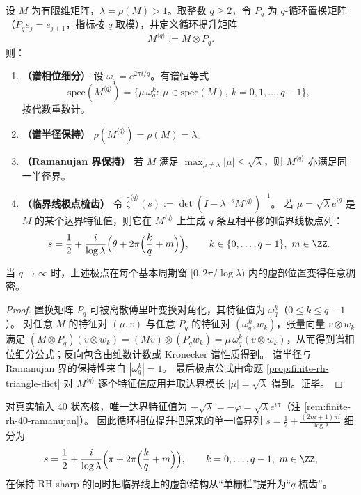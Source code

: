 \begin{proposition}\label{prop:finite-rh-phase-lift}
设 $M$ 为有限维矩阵，$\lambda=\rho(M)>1$。取整数 $q\ge 2$，令 $P_q$ 为 $q$-循环置换矩阵（$P_q e_j=e_{j+1}$，指标按 $q$ 取模），并定义循环提升矩阵
\[
M^{\langle q\rangle}:=M\otimes P_q.
\]
则：
\begin{enumerate}
  \item \textbf{（谱相位细分）} 设 $\omega_q=e^{2\pi i/q}$。有谱恒等式
  \[
  \mathrm{spec}(M^{\langle q\rangle})
  =\{\mu\,\omega_q^k:\ \mu\in \mathrm{spec}(M),\ k=0,1,\dots,q-1\},
  \]
  按代数重数计。
  \item \textbf{（谱半径保持）} $\rho(M^{\langle q\rangle})=\rho(M)=\lambda$。
  \item \textbf{（Ramanujan 界保持）} 若 $M$ 满足 $\max_{\mu\neq \lambda}|\mu|\le \sqrt{\lambda}$，则 $M^{\langle q\rangle}$ 亦满足同一半径界。
  \item \textbf{（临界线极点梳齿）} 令
  \(
  \widehat{\zeta}^{\langle q\rangle}(s):=\det(I-\lambda^{-s}M^{\langle q\rangle})^{-1}
  \)。
  若 $\mu=\sqrt{\lambda}e^{i\theta}$ 是 $M$ 的某个达界特征值，则它在 $M^{\langle q\rangle}$ 上生成 $q$ 条互相平移的临界线极点列：
  \[
  s=\frac12+\frac{i}{\log\lambda}\Bigl(\theta+2\pi\Bigl(\frac{k}{q}+m\Bigr)\Bigr),
  \qquad k\in\{0,\dots,q-1\},\ m\in\ZZ.
  \]
\end{enumerate}
当 $q\to\infty$ 时，上述极点在每个基本周期窗 $[0,2\pi/\log\lambda)$ 内的虚部位置变得任意稠密。
\end{proposition}

\begin{proof}
置换矩阵 $P_q$ 可被离散傅里叶变换对角化，其特征值为 $\omega_q^k$（$0\le k\le q-1$）。
对任意 $M$ 的特征对 $(\mu,v)$ 与任意 $P_q$ 的特征对 $(\omega_q^k,w_k)$，张量向量 $v\otimes w_k$ 满足
\(
(M\otimes P_q)(v\otimes w_k)=(Mv)\otimes(P_qw_k)=\mu\,\omega_q^k (v\otimes w_k)
\)，从而得到谱相位细分公式；反向包含由维数计数或 Kronecker 谱性质得到。
谱半径与 Ramanujan 界的保持性来自 $|\omega_q^k|=1$。
最后极点公式由命题 \ref{prop:finite-rh-triangle-dict} 对 $M^{\langle q\rangle}$ 逐个特征值应用并取达界模长 $|\mu|=\sqrt{\lambda}$ 得到。证毕。
\end{proof}

\begin{remark}\label{rem:finite-rh-40-phase-lift}
对真实输入 $40$ 状态核，唯一达界特征值为 $-\sqrt{\lambda}=-\varphi=\sqrt{\lambda}e^{i\pi}$（注 \ref{rem:finite-rh-40-ramanujan}）。
因此循环相位提升把原来的单一临界列
\(
s=\tfrac12+\frac{(2m+1)\pi i}{\log\lambda}
\)
细分为
\[
s=\frac12+\frac{i}{\log\lambda}\Bigl(\pi+2\pi\Bigl(\frac{k}{q}+m\Bigr)\Bigr),
\qquad k=0,\dots,q-1,\ m\in\ZZ,
\]
在保持 RH-sharp 的同时把临界线上的虚部结构从“单栅栏”提升为“$q$-梳齿”。
\end{remark}

